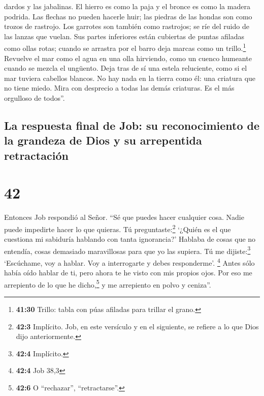 dardos y las jabalinas.  El hierro es como la paja y el
bronce es como la madera podrida.  Las flechas no pueden
hacerle huir; las piedras de las hondas son como trozos de rastrojo.
 Los garrotes son también como rastrojos; se ríe del
ruido de las lanzas que vuelan.  Sus partes inferiores
están cubiertas de puntas afiladas como ollas rotas; cuando se arrastra
por el barro deja marcas como un trillo.\footnote{\textbf{41:30} Trillo:
  tabla con púas afiladas para trillar el grano.} 
Revuelve el mar como el agua en una olla hirviendo, como un cuenco
humeante cuando se mezcla el ungüento.  Deja tras de sí
una estela reluciente, como si el mar tuviera cabellos blancos.
 No hay nada en la tierra como él: una criatura que no
tiene miedo.  Mira con desprecio a todas las demás
criaturas. Es el más orgulloso de todos''.

\hypertarget{la-respuesta-final-de-job-su-reconocimiento-de-la-grandeza-de-dios-y-su-arrepentida-retractaciuxf3n}{%
\subsection{La respuesta final de Job: su reconocimiento de la grandeza
de Dios y su arrepentida
retractación}\label{la-respuesta-final-de-job-su-reconocimiento-de-la-grandeza-de-dios-y-su-arrepentida-retractaciuxf3n}}

\hypertarget{section-41}{%
\section{42}\label{section-41}}

 Entonces Job respondió al Señor.  ``Sé que
puedes hacer cualquier cosa. Nadie puede impedirte hacer lo que quieras.
 Tú preguntaste:\footnote{\textbf{42:3} Implícito. Job, en
  este versículo y en el siguiente, se refiere a lo que Dios dijo
  anteriormente.} `¿Quién es el que cuestiona mi sabiduría hablando con
tanta ignorancia?' Hablaba de cosas que no entendía, cosas demasiado
maravillosas para que yo las supiera.  Tú me
dijiste:\footnote{\textbf{42:4} Implícito.} `Escúchame, voy a hablar.
Voy a interrogarte y debes responderme'. \footnote{\textbf{42:4} Job
  38,3}  Antes sólo había oído hablar de ti, pero ahora te
he visto con mis propios ojos.  Por eso me arrepiento de
lo que he dicho,\footnote{\textbf{42:6} O ``rechazar'', ``retractarse''.}
y me arrepiento en polvo y ceniza''.

